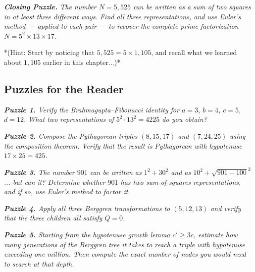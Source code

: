 \documentclass[11pt,openright,twoside]{book}
\renewenvironment{quotation}{%
  \par\vspace{8pt}%
  \begin{list}{}{%
    \setlength{\leftmargin}{2em}%
    \setlength{\rightmargin}{2em}%
  }\item[]\itshape\color{pullquote}%
}{%
  \end{list}%
  \par\vspace{8pt}%
}
\theoremstyle{definition}
\begin{document}
\begin{quotation}
\noindent\itshape \textbf{Closing Puzzle.} The number $N = 5{,}525$ can be written as a sum of two squares in at least three different ways. Find all three representations, and use Euler's method --- applied to each pair --- to recover the complete prime factorization $N = 5^2 \times 13 \times 17$.
\end{quotation}

*(Hint: Start by noticing that $5{,}525 = 5 \times 1{,}105$, and recall what we learned about $1{,}105$ earlier in this chapter...)*


\bigskip


\subsection{Puzzles for the Reader}

\begin{quotation}
\noindent\itshape \textbf{Puzzle 1.} Verify the Brahmagupta--Fibonacci identity for $a = 3$, $b = 4$, $c = 5$, $d = 12$. What two representations of $5^2 \cdot 13^2 = 4225$ do you obtain?
\end{quotation}

\begin{quotation}
\noindent\itshape \textbf{Puzzle 2.} Compose the Pythagorean triples $(8, 15, 17)$ and $(7, 24, 25)$ using the composition theorem. Verify that the result is Pythagorean with hypotenuse $17 \times 25 = 425$.
\end{quotation}

\begin{quotation}
\noindent\itshape \textbf{Puzzle 3.} The number $901$ can be written as $1^2 + 30^2$ and as $10^2 + \sqrt{901 - 100}^2$... but can it? Determine whether $901$ has two sum-of-squares representations, and if so, use Euler's method to factor it.
\end{quotation}

\begin{quotation}
\noindent\itshape \textbf{Puzzle 4.} Apply all three Berggren transformations to $(5, 12, 13)$ and verify that the three children all satisfy $Q = 0$.
\end{quotation}

\begin{quotation}
\noindent\itshape \textbf{Puzzle 5.} Starting from the hypotenuse growth lemma $c' \geq 3c$, estimate how many generations of the Berggren tree it takes to reach a triple with hypotenuse exceeding one million. Then compute the exact number of nodes you would need to search at that depth.
\end{quotation}
\end{document}
